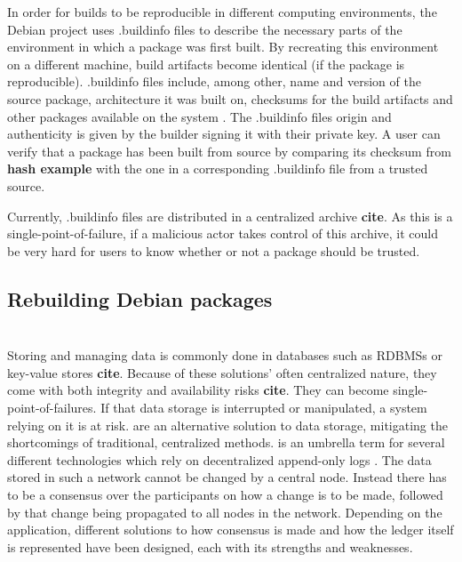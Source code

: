 \documentclass[english, biblatex, digitaloutput]{kththesis}
\begin{document}
In order for builds to be reproducible in different computing environments, the Debian project uses .buildinfo files to describe the necessary parts of the environment in which a package was first built. By recreating this environment on a different machine, build artifacts become identical (if the package is reproducible). .buildinfo files include, among other, name and version of the source package, architecture it was built on, checksums for the build artifacts and other packages available on the system \cite{lamb_reproducible_2021}. The .buildinfo files origin and authenticity is given by the builder signing it with their private  key. A user can verify that a package has been built from source by comparing its checksum from \textbf{hash example} with the one in a corresponding .buildinfo file from a trusted source.

Currently, .buildinfo files are distributed in a centralized archive \textbf{cite}. As this is a single-point-of-failure, if a malicious actor takes control of this archive, it could be very hard for users to know whether or not a package should be trusted.

\subsection{Rebuilding Debian packages}



\section{}

Storing and managing data is commonly done in databases such as \glspl{RDBMS} or key-value stores \textbf{cite}. Because of these solutions' often centralized nature, they come with both integrity and availability risks \textbf{cite}. They can become single-point-of-failures. If that data storage is interrupted or manipulated, a system relying on it is at risk.  are an alternative solution to data storage, mitigating the shortcomings of traditional, centralized methods.  is an umbrella term for several different technologies which rely on decentralized append-only logs \cite{kannengieser_trade-offs_2021} . The data stored in such a network cannot be changed by a central node. Instead there has to be a consensus over the participants on how a change is to be made, followed by that change being propagated to all nodes in the network. Depending on the application, different solutions to how consensus is made and how the ledger itself is represented have been designed, each with its strengths and weaknesses.
\end{document}
